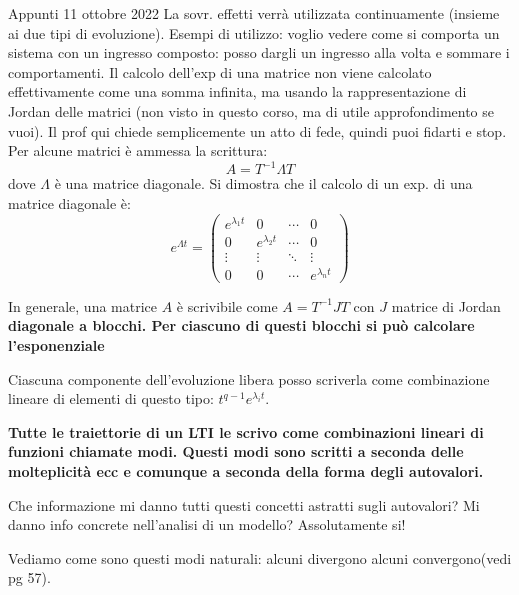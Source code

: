 \documentclass[a4paper]{report}
\begin{document}
\newpage
Appunti 11 ottobre 2022
\bb
La sovr. effetti verrà utilizzata continuamente (insieme ai due tipi di evoluzione). Esempi di utilizzo: voglio vedere come si comporta un sistema con un ingresso composto: posso dargli un ingresso alla volta e sommare i comportamenti.
\bb
Il calcolo dell'exp di una matrice non viene calcolato effettivamente come una somma infinita, ma usando la rappresentazione di Jordan delle matrici (non visto in questo corso, ma di utile approfondimento se vuoi). Il prof qui chiede semplicemente un atto di fede, quindi puoi fidarti e stop.
\bb
Per alcune matrici è ammessa la scrittura: $$ A = T^{-1} \Lambda T$$ dove $\Lambda$ è una matrice diagonale. Si dimostra che il calcolo di un exp. di una matrice diagonale è:
\begin{equation*}
	e^{\Lambda t} = \begin{pmatrix}
		e^{\lambda_1 t} & 0 &  \cdots & 0 \\
		0 & e^{\lambda_2 t} & \cdots & 0 \\
		\vdots & \vdots &  \ddots & \vdots \\ 0 & 0 & \cdots &  e^{\lambda_n t}
	\end{pmatrix}
\end{equation*}

In generale, una matrice $A$ è scrivibile come $A = T^{-1} J T$ con $J$ matrice di Jordan \textbf{diagonale a blocchi. Per ciascuno di questi blocchi si può calcolare l'esponenziale}
\bb
\begin{defin}{}{}
Ciascuna componente dell'evoluzione libera posso scriverla come combinazione lineare di elementi di questo tipo: $t^{q-1} e^{\lambda_i t}.$
\end{defin}


\textbf{Tutte le traiettorie di un LTI le scrivo come combinazioni lineari di funzioni chiamate modi. Questi modi sono scritti a seconda delle molteplicità ecc e comunque a seconda della forma degli autovalori.}



\newpage
Che informazione mi danno tutti questi concetti astratti sugli autovalori? Mi danno info concrete nell'analisi di un modello? Assolutamente si!

Vediamo come sono questi modi naturali:
alcuni divergono alcuni convergono(vedi pg 57).
\end{document}
